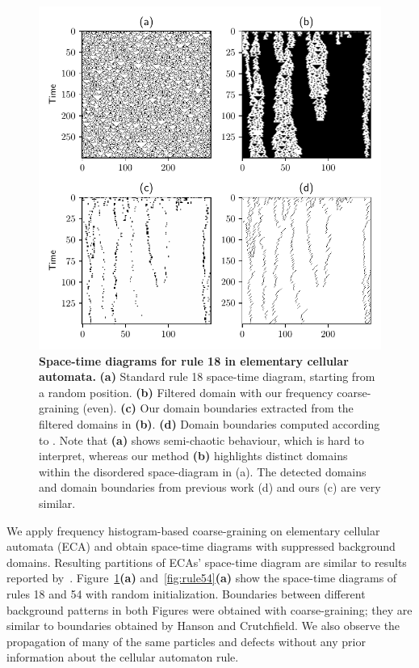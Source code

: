 \begin{figure}[th]
  \centering
  \includegraphics[width=\linewidth]{figures/rule18.pdf}
  \caption{\label{fig:rule18} \textbf{Space-time diagrams for rule 18 in
      elementary cellular automata.} \textbf{(a)} Standard rule 18 space-time
    diagram, starting from a random position. \textbf{(b)} Filtered domain with
    our frequency coarse-graining (even). \textbf{(c)} Our domain boundaries
    extracted from the filtered domains in \textbf{(b)}. \textbf{(d)} Domain
    boundaries computed according to
    \cite{hansonAttractorbasinPortraitCellular1992}. Note that \textbf{(a)}
    shows semi-chaotic behaviour, which is hard to interpret, whereas our method
    \textbf{(b)} highlights distinct domains within the disordered space-diagram
    in (a). The detected domains and domain boundaries from previous work (d)
    and ours (c) are very similar.}
\end{figure}

We apply frequency histogram-based coarse-graining on elementary cellular
automata (ECA) and obtain space-time diagrams with suppressed background
domains. Resulting partitions of ECAs' space-time diagram are similar to results
reported by~\cite{hansonAttractorbasinPortraitCellular1992,
  hansonComputationalMechanicsCellular1997}. Figure~\ref{fig:rule18}\textbf{(a)}
and~\ref{fig:rule54}\textbf{(a)} show the space-time diagrams of rules 18 and 54
with random initialization. Boundaries between different background patterns in
both Figures were obtained with coarse-graining; they are similar to boundaries
obtained by Hanson and Crutchfield. We also observe the propagation of many of
the same particles and defects without any prior information about the cellular
automaton rule.

